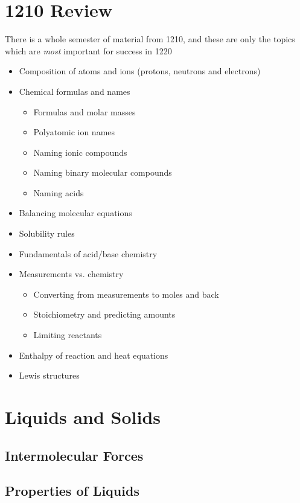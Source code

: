 \documentclass[12pt, openany, letterpaper]{memoir}
\begin{document}
\setcounter{chapter}{-1}
\chapter{1210 Review}

There is a whole semester of material from 1210, and these are only the topics which are \emph{most} important for success in 1220

\begin{itemize}
	\item Composition of atoms and ions (protons, neutrons and electrons)
	\item Chemical formulas and names
	\begin{itemize}
		\item Formulas and molar masses
		\item Polyatomic ion names
		\item Naming ionic compounds
		\item Naming binary molecular compounds
		\item Naming acids
	\end{itemize}
	\item Balancing molecular equations
	\item Solubility rules
	\item Fundamentals of acid/base chemistry
	\item Measurements vs. chemistry
	\begin{itemize}
		\item Converting from measurements to moles and back
		\item Stoichiometry and predicting amounts
		\item Limiting reactants
	\end{itemize}
	\item Enthalpy of reaction and heat equations
	\item Lewis structures
\end{itemize}

\setcounter{chapter}{9}
\chapter{Liquids and Solids}

\section{Intermolecular Forces}

\section{Properties of Liquids}
\end{document}
